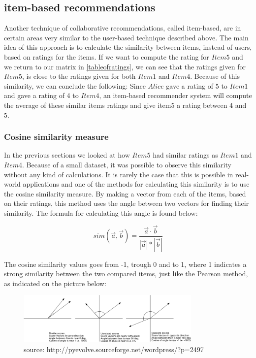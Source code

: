 \subsection{item-based recommendations} %
\label{sub:item_based_recommendations}
Another technique of collaborative recommendations, called item-based, are in certain areas very similar to the user-based technique described above. The main idea of this approach is to calculate the similarity between items, instead of users, based on ratings for the items. If we want to compute the rating for \(Item5\) and we return to our matrix in \ref{tableofratings}, we can see that the ratings given for \(Item5\), is close to the ratings given for both \(Item1\) and \(Item4\). Because of this similarity, we can conclude the following: Since \(Alice\) gave a rating of 5 to \(Item1\) and gave a rating of 4 to \(Item4\), an item-based recommender system will compute the average of these similar items ratings and give item5 a rating between 4 and 5.

\subsubsection{Cosine similarity measure}
In the previous sections we looked at how \(Item5\) had similar ratings as \(Item1\) and \(Item4\). Because of a small dataset, it was possible to observe this similarity without any kind of calculations. It is rarely the case that this is possible in real-world applications and one of the methods for calculating this similarity is to use the cosine similarity measure. \newline 
By making a vector from each of the items, based on their ratings, this method uses the angle between two vectors for finding their similarity. The formula for calculating this angle is found below:

\[
	sim(\vec{a}, \vec{b}) = \frac{\vec{a} \cdot \vec{b}}{|\vec{a}| * |\vec{b}| }
\]


The cosine similarity values goes from -1, trough 0 and to 1, where 1 indicates a strong similarity between the two compared items, just like the Pearson method, as indicated on the picture below:

\begin{figure}[H]
\centering
\includegraphics[width=90mm]{Pictures/cosinesimilarity.png}
\caption{source: http://pyevolve.sourceforge.net/wordpress/?p=2497}
\label{cosinesimilarity}
\end{figure}

